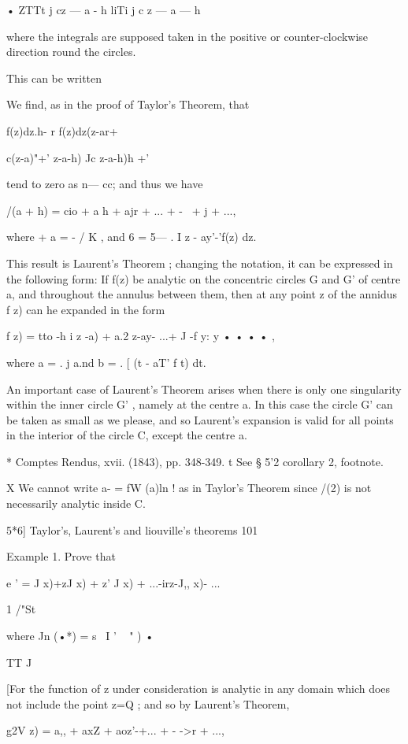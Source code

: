 {{• ZTTt j cz — a - h liTi j c z — a — h

where the integrals are supposed taken in the positive or
counter-clockwise direction round the circles.



This can be written

We find, as in the proof of Taylor's Theorem, that

f(z)dz.h- r f(z)dz(z-ar+

c(z-a)"+' z-a-h) Jc z-a-h)h +'

tend to zero as n— cc; and thus we have

/(a + h) = cio + a h + ajr + ... + -~ + j + ...,

where + a = - / K , and 6 = 5— . I z - ay'-'f(z) dz.

This result is Laurent's Theorem ; changing the notation, it can be
expressed in the following form: If f(z) be analytic on the concentric
circles G and G' of centre a, and throughout the annulus between them,
then at any point z of the annidus f z) can he expanded in the form

f z) = tto -h i z -a) + a.2 z-ay- ...+ J -f y: y • • • • ,

where a = . j a.nd b = . [ (t - aT' f t) dt.

An important case of Laurent's Theorem arises when there is only one
singularity within the inner circle G' , namely at the centre a. In
this case the circle G' can be taken as small as we please, and so
Laurent's expansion is valid for all points in the interior of the
circle C, except the centre a.

* Comptes Rendus, xvii. (1843), pp. 348-349. t See § 5'2 corollary 2,
footnote.

X We cannot write a- = fW (a)ln ! as in Taylor's Theorem since /(2) is
not necessarily analytic inside C.



5*6] Taylor's, Laurent's and liouville's theorems 101

Example 1. Prove that

e ' = J x)+zJ x) + z' J x) + ...-irz-J,, x)- ...

1 /"St

where Jn (•*) = s~ I ' ~ " ) •

 TT J

[For the function of z under consideration is analytic in any domain
which does not include the point z=Q ; and so by Laurent's Theorem,

g2V z) = a,, + axZ + aoz'-+... + - ->r + ...,

}}
